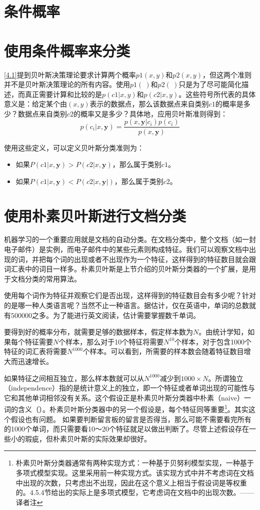 \section{条件概率}

\section{使用条件概率来分类}
\autoref{4.1}提到贝叶斯决策理论要求计算两个概率$p1(x, y)$和$p2(x, y)$，但这两个准则并不是贝叶斯决策理论的所有内容。使用$p1(~)$和$p2(~)$只是为了尽可能简化描述，而真正需要计算和比较的是$p(c1|x, y)$和$p(c2|x, y)$。这些符号所代表的具体意义是：给定某个由$(x, y)$表示的数据点，那么该数据点来自类别$c1$的概率是多少？数据点来自类别$c2$的概率又是多少？具体地，应用贝叶斯准则得到：
\begin{equation*}
    p(c_i|x, \bm{y})=\frac{p(x,\bm{y}|c_i)p(c_i)}{p(x,\bm{y})}
\end{equation*}

使用这些定义，可以定义贝叶斯分类准则为：
\begin{itemize}
    \item 如果$P(c1|x, \bm{y}) > P(c2|x, \bm{y})$，那么属于类别$c1$。
    \item 如果$P(c1|x, \bm{y}) < P(c2|x, \bm{y|})$，那么属于类别$c2$。
\end{itemize}

\section{使用朴素贝叶斯进行文档分类}
机器学习的一个重要应用就是文档的自动分类。在文档分类中，整个文档（如一封电子邮件）是实例，而电子邮件中的某些元素则构成特征。我们可以观察文档中出现的词，并把每个词的出现或者不出现作为一个特征，这样得到的特征数目就会跟词汇表中的词目一样多。朴素贝叶斯是上节介绍的贝叶斯分类器的一个扩展，是用于文档分类的常用算法。

使用每个词作为特征并观察它们是否出现，这样得到的特征数目会有多少呢？针对的是哪一种人类语言呢？当然不止一种语言。据估计，仅在英语中，单词的总数就有$\num{500000}$之多。为了能进行英文阅读，估计需要掌握数千单词。

要得到好的概率分布，就需要足够的数据样本，假定样本数为$N$。由统计学知，如果每个特征需要$N$个样本，那么对于10个特征将需要$N^{10}$个样本，对于包含1000个特征的词汇表将需要$N^{1000}$个样本。可以看到，所需要的样本数会随着特征数目增大而迅速增长。

如果特征之间相互独立，那么样本数就可以从$N^{1000}$减少到$1000\times N$。所谓独立（independence）指的是统计意义上的独立，即一个特征或者单词出现的可能性与它和其他单词相邻没有关系。这个假设正是朴素贝叶斯分类器中朴素（naive）一词的含义（）。朴素贝叶斯分类器中的另一个假设是，每个特征同等重要\footnote{朴素贝叶斯分类器通常有两种实现方式：一种基于贝努利模型实现，一种基于多项式模型实现。这里采用前一种实现方式。该实现方式中并不考虑词在文档中出现的次数，只考虑出不出现，因此在这个意义上相当于假设词是等权重的。4.5.4节给出的实际上是多项式模型，它考虑词在文档中的出现次数。——译者注}。其实这个假设也有问题。 如果要判断留言板的留言是否得当，那么可能不需要看完所有的1000个单词，而只需要看10～20个特征就足以做出判断了。尽管上述假设存在一些小的瑕疵，但朴素贝叶斯的实际效果却很好。
